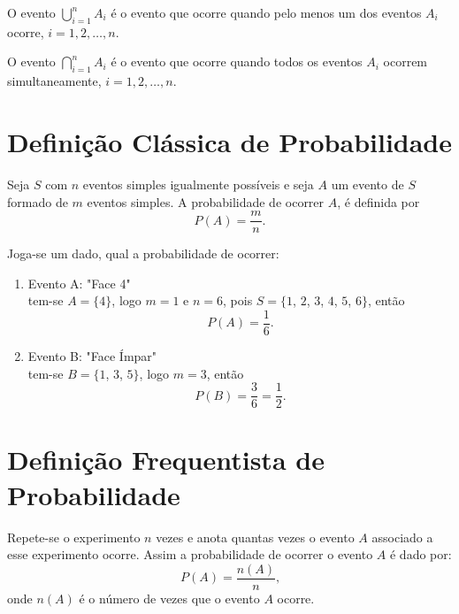 \begin{definition}
	O evento $\displaystyle\bigcup_{i=1}^{n} A_i$ é o evento que ocorre quando pelo menos um dos eventos $A_i$ ocorre, $i=1,2,\dots, n$.
\end{definition}

\begin{definition}
	O evento $\displaystyle\bigcap_{i=1}^{n} A_i$ é o evento que ocorre quando todos os eventos $A_i$ ocorrem simultaneamente, $i=1,2,\dots, n$.
\end{definition}

\section{Definição Clássica de Probabilidade}

Seja $S$ com $n$ eventos simples igualmente possíveis e seja $A$ um evento de $S$ formado de $m$ eventos simples. A probabilidade de ocorrer $A$, é definida por
\begin{equation}
	P(A)=\frac{m}{n}\text{.}
\end{equation}

\begin{example}
	Joga-se um dado, qual a probabilidade de ocorrer:
	\begin{enumerate}[label=\alph*)]
		\item Evento A: "Face 4"\\
		
		tem-se $A=\{4\}$, logo $m=1$ e $n=6$, pois $S=\{1$, $2$, $3$, $4$, $5$, $6\}$, então
		\[
			P(A)=\frac{1}{6}\text{.}
		\]
		
		\item Evento B: "Face Ímpar"\\
		
		tem-se $B=\{1$, $3$, $5\}$, logo $m=3$, então
		\[
			P(B)=\frac{3}{6}=\frac{1}{2}\text{.}
		\]
	\end{enumerate}
\end{example}

\section{Definição Frequentista de Probabilidade}

Repete-se o experimento $n$ vezes e anota quantas vezes o evento $A$ associado a esse experimento ocorre. Assim a probabilidade de ocorrer o evento $A$ é dado por:
\begin{equation}
	P(A)=\frac{n(A)}{n}\text{,}
\end{equation}
onde $n(A)$ é o número de vezes que o evento $A$ ocorre.

